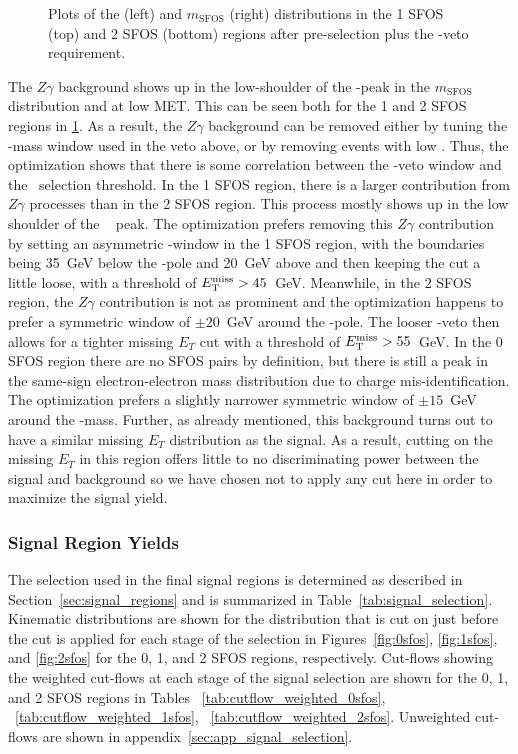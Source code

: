 \begin{figure}[ht!]
\caption{Plots of the \MET (left) and $m_{\textrm{SFOS}}$ (right) distributions 
in the 1 SFOS (top) and 2 SFOS (bottom) regions after pre-selection
plus the \bee-veto requirement.}
\label{fig:met_zwindow_optimization}
\end{figure}

The $Z\gamma$ background shows up in the low-shoulder of the \z-peak
in the $m_{\textrm{SFOS}}$ distribution and at low MET. This can be
seen both for the 1 and 2 SFOS regions in \fig\ref{fig:met_zwindow_optimization}.
As a result, the $Z\gamma$ background can be removed either by tuning 
the \z-mass window used in the veto above, or by removing events with low \met.
Thus, the optimization shows that there is some correlation 
between the \z-veto window and the \met~selection threshold. 
In the 1 SFOS region, there is a larger 
contribution from $Z\gamma$ processes than in the 2 SFOS
region.  This process mostly shows up in the low shoulder 
of the \z~ peak. The optimization
prefers removing this $Z\gamma$ contribution by setting an 
asymmetric \z-window in the 1 SFOS
region, with the boundaries being 35~GeV below the \z-pole 
and 20~GeV above and then keeping the \MET cut a little loose, with a 
threshold of $E_{\mathrm{T}}^{\mathrm{miss}} > 45$~GeV.  Meanwhile, in the 2 SFOS region,
the $Z\gamma$ contribution is not as prominent and the 
optimization happens to prefer a symmetric
window of $\pm20$~GeV around the \z-pole.  
The looser \z-veto then allows for a tighter
missing $E_{T}$ cut with a threshold of $E_{\mathrm{T}}^{\mathrm{miss}} > 55$~GeV. 
In the 0 SFOS region there 
are no SFOS pairs by definition,
but there is still a peak in the same-sign electron-electron mass 
distribution due to charge mis-identification.
The optimization prefers a slightly narrower symmetric window 
of $\pm15$~GeV around the \z-mass. 
Further, as already mentioned,
this background turns out 
to have a similar missing $E_{T}$ distribution
as the signal. As a result, cutting on the missing $E_{T}$ in this region 
offers little to no discriminating power
between the signal and background so we have chosen not to apply 
any cut here in order to maximize the signal yield.

\subsubsection{Signal Region Yields}
\label{sec:signal_yield}



The selection used in the final signal regions is determined as described in Section~\ref{sec:signal_regions} and is summarized in Table~\ref{tab:signal_selection}. Kinematic distributions are shown for the distribution
that is cut on just before the cut is applied
for each stage of the selection in Figures~\ref{fig:0sfos}, \ref{fig:1sfos}, and \ref{fig:2sfos} for
the 0, 1, and 2 SFOS regions, respectively.
Cut-flows showing the weighted cut-flows at each stage of the signal selection are shown for the 0, 1, and 2 SFOS regions
in Tables ~\ref{tab:cutflow_weighted_0sfos}, ~\ref{tab:cutflow_weighted_1sfos}, ~\ref{tab:cutflow_weighted_2sfos}.
Unweighted cut-flows are shown in appendix~\ref{sec:app_signal_selection}.

